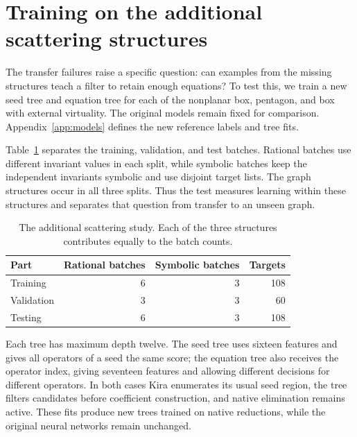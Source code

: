 \providecommand{\StudySection}{\section}
\providecommand{\StudySubsection}{\subsection}

\StudySection{Training on the additional scattering structures}
\label{sec:adaptation}
The transfer failures raise a specific question: can examples from the missing structures teach a filter to retain enough equations? To test this, we train a new seed tree and equation tree for each of the nonplanar box, pentagon, and box with external virtuality. The original models remain fixed for comparison. Appendix~\ref{app:models} defines the new reference labels and tree fits.

Table~\ref{tab:scattering-split} separates the training, validation, and test batches. Rational batches use different invariant values in each split, while symbolic batches keep the independent invariants symbolic and use disjoint target lists. The graph structures occur in all three splits. Thus the test measures learning within these structures and separates that question from transfer to an unseen graph.

\begin{table}[!htbp]
\centering\small
\caption{The additional scattering study. Each of the three structures contributes equally to the batch counts.}
\label{tab:scattering-split}
\begin{tabular}{@{}lrrr@{}}\toprule
Part & Rational batches & Symbolic batches & Targets\\\midrule
Training & 6 & 3 & 108\\
Validation & 3 & 3 & 60\\
Testing & 6 & 3 & 108\\\bottomrule
\end{tabular}
\end{table}

Each tree has maximum depth twelve. The seed tree uses sixteen features and gives all operators of a seed the same score; the equation tree also receives the operator index, giving seventeen features and allowing different decisions for different operators. In both cases Kira enumerates its usual seed region, the tree filters candidates before coefficient construction, and native elimination remains active. These fits produce new trees trained on native reductions, while the original neural networks remain unchanged.


